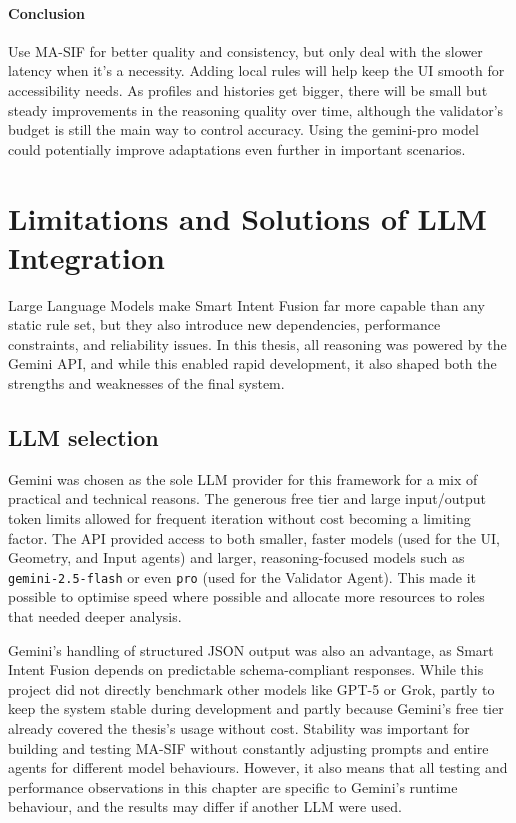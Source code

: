 \paragraph{Conclusion}
Use MA-SIF for better quality and consistency, but only deal with the slower latency when it’s a necessity. Adding local rules will help keep the UI smooth for accessibility needs. As profiles and histories get bigger, there will be small but steady improvements in the reasoning quality over time, although the validator’s budget is still the main way to control accuracy. Using the gemini-pro model could potentially improve adaptations even further in important scenarios.

\section{Limitations and Solutions of LLM Integration}
Large Language Models make Smart Intent Fusion far more capable than any static rule set, but they also introduce new dependencies, performance constraints, and reliability issues. In this thesis, all reasoning was powered by the Gemini API, and while this enabled rapid development, it also shaped both the strengths and weaknesses of the final system.

\subsection{LLM selection}
Gemini was chosen as the sole LLM provider for this framework for a mix of practical and technical reasons. The generous free tier and large input/output token limits allowed for frequent iteration without cost becoming a limiting factor. The API provided access to both smaller, faster models (used for the UI, Geometry, and Input agents) and larger, reasoning-focused models such as \texttt{gemini-2.5-flash} or even \texttt{pro} (used for the Validator Agent). This made it possible to optimise speed where possible and allocate more resources to roles that needed deeper analysis.

Gemini’s handling of structured JSON output was also an advantage, as Smart Intent Fusion depends on predictable schema-compliant responses. While this project did not directly benchmark other models like GPT-5 or Grok, partly to keep the system stable during development and partly because Gemini’s free tier already covered the thesis’s usage without cost. Stability was important for building and testing MA-SIF without constantly adjusting prompts and entire agents for different model behaviours. However, it also means that all testing and performance observations in this chapter are specific to Gemini’s runtime behaviour, and the results may differ if another LLM were used.

